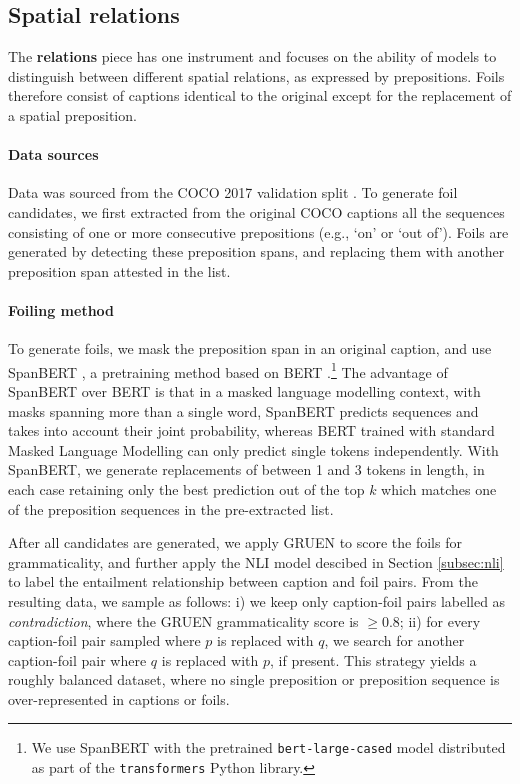 \documentclass[11pt]{article}
\begin{document}
\subsection{Spatial relations}\label{app:relations}
The \textbf{relations} piece has one instrument and focuses on the ability of models to distinguish between different spatial relations, as expressed by prepositions. Foils therefore consist of captions identical to the original except for the replacement of a spatial preposition.

\paragraph{Data sources} Data
was sourced from the COCO 2017 validation split \cite{Chen2015}. To generate foil candidates, we first extracted from the original COCO captions all the sequences consisting of one or more consecutive prepositions (e.g., `on' or `out of'). Foils are generated by detecting these preposition spans, and replacing them with another preposition span attested in the list.

\paragraph{Foiling method} To generate foils, we mask the preposition span in an original caption, and use SpanBERT \cite{joshi-etal-2020-spanbert}, a pretraining method based on BERT \cite{devlin2019bert}.\footnote{We use SpanBERT with the pretrained {\tt bert-large-cased} model distributed as part of the {\tt transformers} Python library. } The advantage of SpanBERT over BERT is that in a masked language modelling context, with masks spanning more than a single word, SpanBERT predicts sequences and takes into account their joint probability, whereas BERT trained with standard Masked Language Modelling can only predict single tokens independently. With SpanBERT, we generate replacements of between 1 and 3 tokens in length, in each case retaining only the best prediction out of the top $k$ which matches one of the preposition sequences in the pre-extracted list. 




After all candidates are generated, we apply GRUEN \cite{zhu-bhat-2020-gruen} to score the foils for grammaticality, and further apply the NLI model descibed in Section \ref{subsec:nli} to label the entailment relationship between caption and foil pairs. From the resulting data, we sample as follows: i) we keep only caption-foil pairs labelled as {\em contradiction}, where the GRUEN grammaticality score is $\geq 0.8$; ii) for every caption-foil pair sampled where $p$ is replaced with $q$, we search for another caption-foil pair where $q$ is replaced with $p$, if present. This strategy yields a roughly balanced dataset, where no single preposition or preposition sequence is over-represented in captions or foils. 
\end{document}
